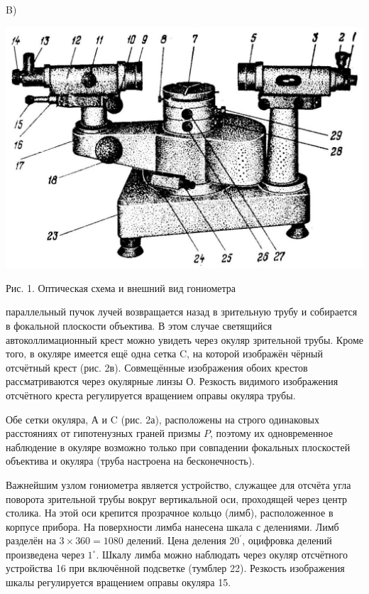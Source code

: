 \documentclass[a4paper, 12pt]{article}
\begin{document}
B)

\begin{center}
\includegraphics[scale=0.2]{2023_04_02_a48ae02e429ba186bcd7g-2(1)}

Рис. 1. Оптическая схема и внешний вид гониометра

\end{center}

 параллельный пучок лучей возвращается назад в зрительную трубу и собирается в фокальной плоскости объектива. В этом случае светящийся автоколлимационный крест можно увидеть через окуляр зрительной трубы. Кроме того, в окуляре имеется ещё одна сетка C, на которой изображён чёрный отсчётный крест (рис. 2в). Совмещённые изображения обоих крестов рассматриваются через окулярные линзы О. Резкость видимого изображения отсчётного креста регулируется вращением оправы окуляра трубы.

Обе сетки окуляра, А и C (рис. 2а), расположены на строго одинаковых расстояниях от гипотенузных граней призмы $P$, поэтому их одновременное наблюдение в окуляре возможно только при совпадении фокальных плоскостей объектива и окуляра (труба настроена на бесконечность).

Важнейшим узлом гониометра является устройство, служащее для отсчёта угла поворота зрительной трубы вокруг вертикальной оси, проходящей через центр столика. На этой оси крепится прозрачное кольцо (лимб), расположенное в корпусе прибора. На поверхности лимба нанесена шкала с делениями. Лимб разделён на $3 \times 360=1080$ делений. Цена деления $20^{\prime}$, оцифровка делений произведена через $1^{\circ}$. Шкалу лимба можно наблюдать через окуляр отсчётного устройства 16 при включённой подсветке (тумблер 22). Резкость изображения шкалы регулируется вращением оправы окуляра 15.
\end{document}
